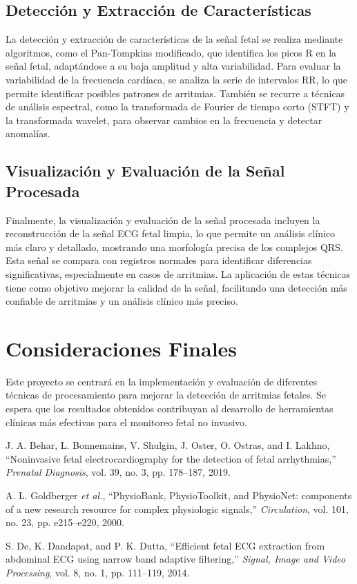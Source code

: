 \documentclass[10pt, conference]{IEEEtran}
\begin{document}
\subsection{Detección y Extracción de Características}

La detección y extracción de características de la señal fetal se realiza mediante algoritmos, como el Pan-Tompkins modificado, que identifica los picos R en la señal fetal, adaptándose a su baja amplitud y alta variabilidad. Para evaluar la variabilidad de la frecuencia cardíaca, se analiza la serie de intervalos RR, lo que permite identificar posibles patrones de arritmias. También se recurre a técnicas de análisis espectral, como la transformada de Fourier de tiempo corto (STFT) y la transformada wavelet, para observar cambios en la frecuencia y detectar anomalías.

\subsection{Visualización y Evaluación de la Señal Procesada}

Finalmente, la visualización y evaluación de la señal procesada incluyen la reconstrucción de la señal ECG fetal limpia, lo que permite un análisis clínico más claro y detallado, mostrando una morfología precisa de los complejos QRS. Esta señal se compara con registros normales para identificar diferencias significativas, especialmente en casos de arritmias. La aplicación de estas técnicas tiene como objetivo mejorar la calidad de la señal, facilitando una detección más confiable de arritmias y un análisis clínico más preciso.

\section{Consideraciones Finales}

Este proyecto se centrará en la implementación y evaluación de diferentes técnicas de procesamiento para mejorar la detección de arritmias fetales. Se espera que los resultados obtenidos contribuyan al desarrollo de herramientas clínicas más efectivas para el monitoreo fetal no invasivo.

\begin{thebibliography}{00}

	 J. A. Behar, L. Bonnemains, V. Shulgin, J. Oster, O. Ostras, and I. Lakhno, ``Noninvasive fetal electrocardiography for the detection of fetal arrhythmias,'' \textit{Prenatal Diagnosis}, vol. 39, no. 3, pp. 178--187, 2019.

	 A. L. Goldberger \textit{et al.}, ``PhysioBank, PhysioToolkit, and PhysioNet: components of a new research resource for complex physiologic signals,'' \textit{Circulation}, vol. 101, no. 23, pp. e215--e220, 2000.

	 S. De, K. Dandapat, and P. K. Dutta, ``Efficient fetal ECG extraction from abdominal ECG using narrow band adaptive filtering,'' \textit{Signal, Image and Video Processing}, vol. 8, no. 1, pp. 111--119, 2014.

\end{thebibliography}
\end{document}
